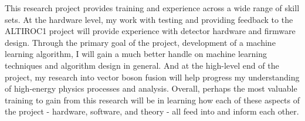\documentclass[paper=a4,fontsize=12pt]{article}
\begin{document}
This research project provides training and experience across a wide range of skill sets. At the hardware level, my work with testing and providing feedback to the ALTIROC1 project will provide experience with detector hardware and firmware design. Through the primary goal of the project, development of a machine learning algorithm, I will gain a much better handle on machine learning techniques and algorithm design in general. And at the high-level end of the project, my research into vector boson fusion will help progress my understanding of high-energy physics processes and analysis. Overall, perhaps the most valuable training to gain from this research will be in learning how each of these aspects of the project - hardware, software, and theory - all feed into and inform each other.
\end{document}
